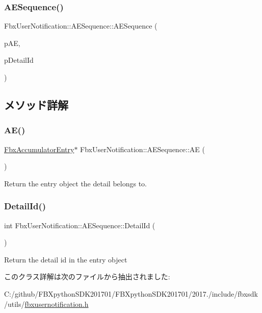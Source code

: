 \subsubsection{\texorpdfstring{A\+E\+Sequence()}{AESequence()}}
{\footnotesize\ttfamily Fbx\+User\+Notification\+::\+A\+E\+Sequence\+::\+A\+E\+Sequence (\begin{DoxyParamCaption}\item[{\hyperlink{class_fbx_accumulator_entry}{Fbx\+Accumulator\+Entry} $\ast$}]{p\+AE,  }\item[{int}]{p\+Detail\+Id }\end{DoxyParamCaption})}



\subsection{メソッド詳解}
\mbox{\label{class_fbx_user_notification_1_1_a_e_sequence_a62caeec18280c5f51f0d44b6a9cab155}} 
\subsubsection{\texorpdfstring{A\+E()}{AE()}}
{\footnotesize\ttfamily \hyperlink{class_fbx_accumulator_entry}{Fbx\+Accumulator\+Entry}$\ast$ Fbx\+User\+Notification\+::\+A\+E\+Sequence\+::\+AE (\begin{DoxyParamCaption}{ }\end{DoxyParamCaption})}



Return the entry object the detail belongs to. 

\mbox{\label{class_fbx_user_notification_1_1_a_e_sequence_ad3052bbb86f4b73424e0f00a52f27218}} 
\subsubsection{\texorpdfstring{Detail\+Id()}{DetailId()}}
{\footnotesize\ttfamily int Fbx\+User\+Notification\+::\+A\+E\+Sequence\+::\+Detail\+Id (\begin{DoxyParamCaption}{ }\end{DoxyParamCaption})}



Return the detail id in the entry object 



このクラス詳解は次のファイルから抽出されました\+:\begin{DoxyCompactItemize}
\item 
C\+:/github/\+F\+B\+Xpython\+S\+D\+K201701/\+F\+B\+Xpython\+S\+D\+K201701/2017./include/fbxsdk/utils/\hyperlink{fbxusernotification_8h}{fbxusernotification.\+h}\end{DoxyCompactItemize}
